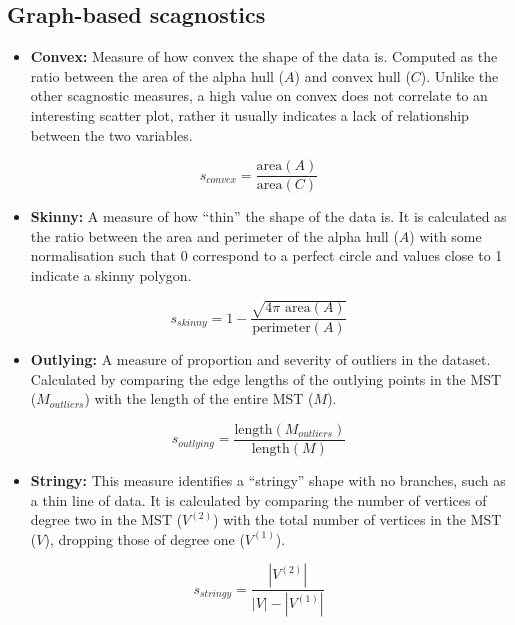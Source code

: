 \subsection{Graph-based scagnostics}\label{graph-based-scagnostics}

\begin{itemize}
\tightlist
\item
  \textbf{Convex:} Measure of how convex the shape of the data is. Computed as the ratio between the area of the alpha hull (\(A\)) and convex hull (\(C\)). Unlike the other scagnostic measures, a high value on convex does not correlate to an interesting scatter plot, rather it usually indicates a lack of relationship between the two variables.
\end{itemize}

\[s_{convex}=\frac{\mbox{area}(A)}{\mbox{area}(C)}\]

\begin{itemize}
\tightlist
\item
  \textbf{Skinny:} A measure of how ``thin'' the shape of the data is. It is calculated as the ratio between the area and perimeter of the alpha hull (\(A\)) with some normalisation such that 0 correspond to a perfect circle and values close to 1 indicate a skinny polygon.
\end{itemize}

\[s_{skinny}= 1-\frac{\sqrt{4\pi \mbox{ area}(A)}}{\mbox{perimeter}(A)}\]

\begin{itemize}
\tightlist
\item
  \textbf{Outlying:} A measure of proportion and severity of outliers in the dataset. Calculated by comparing the edge lengths of the outlying points in the MST (\(M_{outliers}\)) with the length of the entire MST (\(M\)).
\end{itemize}

\[s_{outlying}=\frac{\mbox{length}(M_{outliers})}{\mbox{length}(M)}\]

\begin{itemize}
\tightlist
\item
  \textbf{Stringy:} This measure identifies a ``stringy'' shape with no branches, such as a thin line of data. It is calculated by comparing the number of vertices of degree two in the MST (\(V^{(2)}\)) with the total number of vertices in the MST (\(V\)), dropping those of degree one (\(V^{(1)}\)).
\end{itemize}

\[s_{stringy} = \frac{|V^{(2)}|}{|V|-|V^{(1)}|}\]

